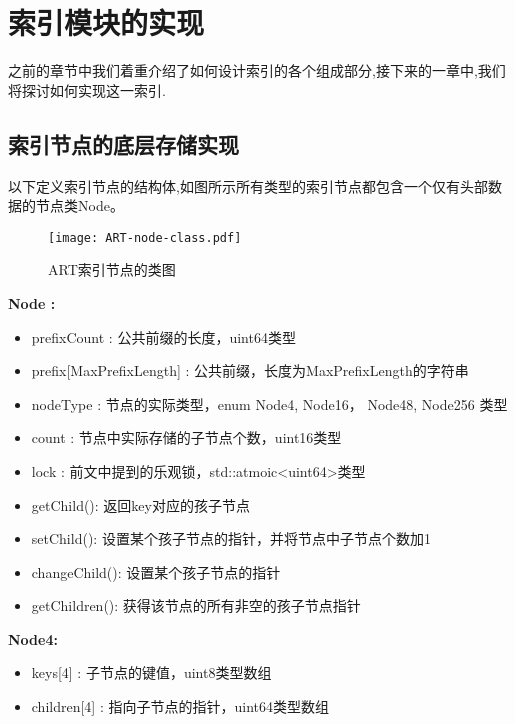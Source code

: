 
\chapter{索引模块的实现}

之前的章节中我们着重介绍了如何设计索引的各个组成部分,接下来的一章中,我们将探讨如何实现这一索引.

\section{索引节点的底层存储实现}

以下定义索引节点的结构体,如图所示所有类型的索引节点都包含一个仅有头部数据的节点类Node。

\begin{figure}[h]
  \centering
  \texttt{[image: ART-node-class.pdf]}
  \caption{ART索引节点的类图}
  \label{fig:ART-node-class}
\end{figure}

\textbf{Node :}
\begin{itemize}
\item prefixCount : 公共前缀的长度，uint64类型

\item prefix[MaxPrefixLength] : 公共前缀，长度为MaxPrefixLength的字符串

\item nodeType : 节点的实际类型，enum {Node4, Node16， Node48, Node256} 类型

\item count : 节点中实际存储的子节点个数，uint16类型

\item lock : 前文中提到的乐观锁，std::atmoic<uint64>类型

\item getChild(): 返回key对应的孩子节点

\item setChild(): 设置某个孩子节点的指针，并将节点中子节点个数加1

\item changeChild(): 设置某个孩子节点的指针

\item getChildren(): 获得该节点的所有非空的孩子节点指针 
\end{itemize}

\textbf{Node4:}
\begin{itemize}
\item keys[4] : 子节点的键值，uint8类型数组

\item children[4] : 指向子节点的指针，uint64类型数组
\end{itemize}

